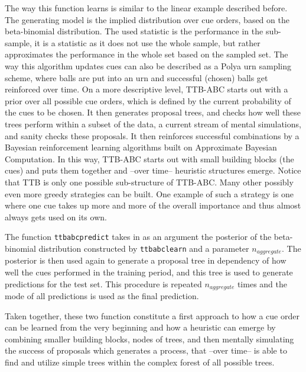 \documentclass[a4paper,man, natbib]{apa6}
\begin{document}
The way this function learns is similar to the linear example described before. The generating model is the implied distribution over cue orders, based on the beta-binomial distribution. The used statistic is the performance in the sub-sample, it is a statistic as it does not use the whole sample, but rather approximates the performance in the whole set based on the sampled set. The way this algorithm updates cues can also be described as a Polya urn sampling scheme, where balls are put into an urn and successful (chosen) balls get reinforced over time. On a more descriptive level, TTB-ABC starts out with a prior over all possible cue orders, which is defined by the current probability of the cues to be chosen. It then generates proposal trees, and checks how well these trees perform within a subset of the data, a current stream of mental simulations, and sanity checks these proposals. It then reinforces successful combinations by a Bayesian reinforcement learning algorithms \citep{poupart2010bayesian} built on Approximate Bayesian Computation. In this way, TTB-ABC starts out with small building blocks (the cues) and puts them together and --over time-- heuristic structures emerge. Notice that TTB is only one possible sub-structure of TTB-ABC. Many other possibly even more greedy strategies can be built. One example of such a strategy is one where one cue takes up more and more of the overall importance and thus almost always gets used on its own.

The function \texttt{ttbabcpredict} takes in as an argument the posterior of the beta-binomial distribution constructed by \texttt{ttbabclearn} and a parameter $n_{aggregate}$.  The posterior is then used again to generate a proposal tree in dependency of how well the cues performed in the training period, and this tree is used to generate predictions for the test set. This procedure is repeated  $n_{aggregate}$ times and the mode of all predictions is used as the final prediction.

Taken together, these two function constitute a first approach to how a cue order can be learned from the very beginning and how a heuristic can emerge by combining smaller building blocks, nodes of trees, and then mentally simulating the success of proposals which generates a process, that --over time-- is able to find and utilize simple trees within the complex forest of all possible trees.  %

\end{document}
